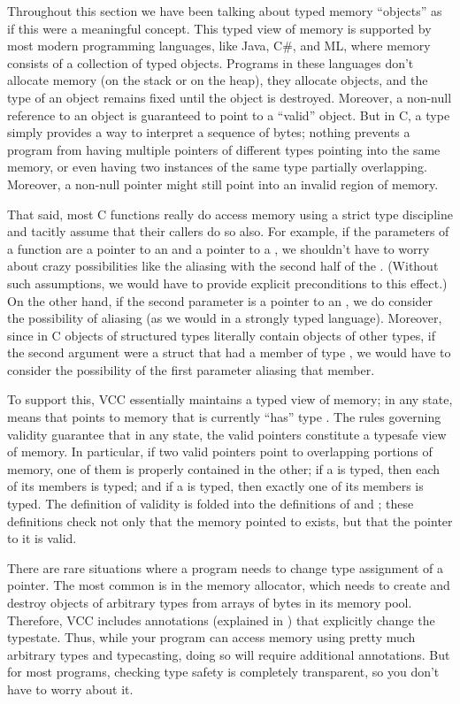 Throughout this section
we have been talking about typed memory ``objects'' as if this were a
meaningful concept.  This typed view of memory is supported by most
modern programming languages, like Java, C\#, and ML, where memory
consists of a collection of typed objects. Programs in these languages
don't allocate memory (on the stack or on the heap), they allocate
objects, and the type of an object remains fixed until the object is
destroyed. Moreover, a non-null reference to an object is guaranteed to
point to a ``valid'' object. But in C, a type simply provides a way to
interpret a sequence of bytes; nothing prevents a program from having
multiple pointers of different types pointing into the same memory, or
even having two instances of the same  type partially
overlapping. Moreover, a non-null pointer might still point into an
invalid region of memory.

That said, most C functions really do access memory using a strict type
discipline and tacitly assume that their callers do
so also. For example, if the parameters of a function are a pointer to
an  and a pointer to a , we shouldn't have to worry
about crazy possibilities like the  aliasing with the second
half of the . (Without such assumptions, we would have to
provide explicit preconditions to this effect.)  On the other hand, if
the second parameter is a pointer to an , we do consider the
possibility of aliasing (as we would in a strongly typed language).
Moreover, since in C objects of structured types literally contain
objects of other types, if the second argument were a struct that had
a member of type , we would have to consider the possibility
of the first parameter aliasing that member. 

To support this, VCC essentially maintains a typed view of memory; in
any state,  means that  points to memory that is
currently ``has'' type . The rules governing validity guarantee
that in any state, the valid pointers constitute a typesafe view of
memory.  In particular, if two valid pointers point to overlapping
portions of memory, one of them is properly contained in the other; if
a  is typed, then each of its members is typed; and if a
 is typed, then exactly one of its members is typed.  The
definition of validity is folded into the definitions of
 and \vcc{\unwrapped}; these definitions check not
only that the memory pointed to exists, but that the pointer to it is
valid.

There are rare situations where a program needs to change type
assignment of a pointer.  The most common is in the memory allocator,
which needs to create and destroy objects of arbitrary types from
arrays of bytes in its memory pool. Therefore, VCC includes
annotations (explained in ) that explicitly change the
typestate.  Thus, while your program can access memory using pretty
much arbitrary types and typecasting, doing so will require additional
annotations. But for most programs, checking type safety is completely
transparent, so you don't have to worry about it.


